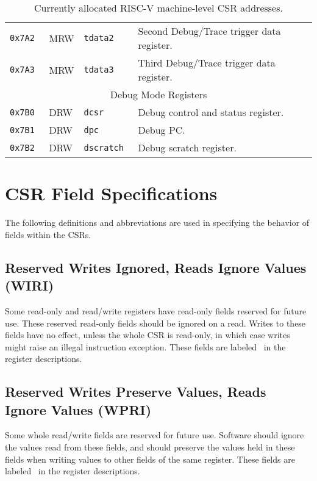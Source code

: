 \begin{table}[htb!]
\begin{center}
\begin{tabular}{|l|l|l|l|}
\tt 0x7A2 & MRW &\tt tdata2 & Second Debug/Trace trigger data register. \\
\tt 0x7A3 & MRW &\tt tdata3 & Third Debug/Trace trigger data register. \\
\hline
\multicolumn{4}{|c|}{Debug Mode Registers } \\
\hline
\tt 0x7B0 & DRW &\tt dcsr & Debug control and status register. \\
\tt 0x7B1 & DRW &\tt dpc & Debug PC. \\
\tt 0x7B2 & DRW &\tt dscratch & Debug scratch register. \\
\hline
\end{tabular}
\end{center}
\caption{Currently allocated RISC-V machine-level CSR addresses.}
\label{mcsrnames}
\end{table}

\clearpage

\section{CSR Field Specifications}


The following definitions and abbreviations are used in specifying the
behavior of fields within the CSRs.

\subsection*{Reserved Writes Ignored, Reads Ignore Values (WIRI)}

Some read-only and read/write registers have read-only fields reserved
for future use.  These reserved read-only fields should be ignored on
a read.  Writes to these fields have no effect, unless the whole CSR
is read-only, in which case writes might raise an illegal instruction
exception. These fields are labeled \wiri\ in the register
descriptions.

\subsection*{Reserved Writes Preserve Values, Reads Ignore Values (WPRI)}

Some whole read/write fields are reserved for future use.  Software
should ignore the values read from these fields, and should preserve
the values held in these fields when writing values to other fields of
the same register.  These fields are labeled \wpri\ in the register
descriptions.


